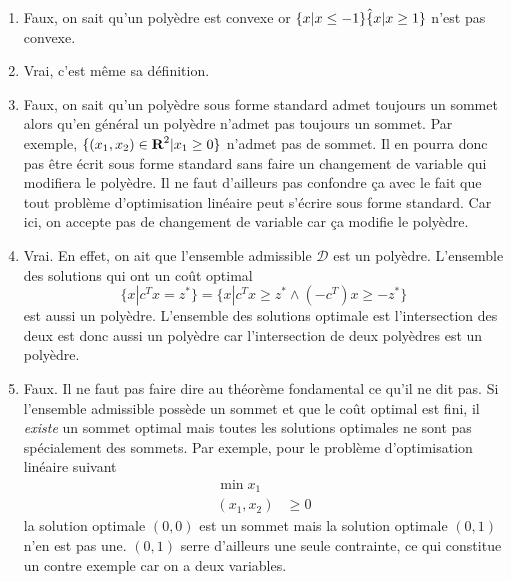 \begin{enumerate}
    \begin{solution}
      \begin{enumerate}
        \item Faux, on sait qu'un polyèdre est convexe or
          $\{x | x \leq -1\} \hat \{x | x \geq 1\}$ n'est pas convexe.
        \item Vrai, c'est même sa définition.
        \item Faux, on sait qu'un polyèdre sous forme standard admet
          toujours un sommet alors qu'en général un polyèdre n'admet pas
          toujours un sommet.
          Par exemple, $\{(x_1,x_2) \in {\mbox{\bf R}}^2 | x_1 \geq 0\}$ n'admet
          pas de sommet. Il en pourra donc pas être écrit sous forme standard
          sans faire un changement de variable qui modifiera le polyèdre.
          Il ne faut d'ailleurs pas confondre ça avec le fait que tout
          problème d'optimisation linéaire peut s'écrire sous forme standard.
          Car ici, on accepte pas de changement de variable car ça
          modifie le polyèdre.
        \item Vrai. En effet, on ait que l'ensemble admissible $\mathcal{D}$
          est un polyèdre.
          L'ensemble des solutions qui ont un coût optimal
          \[ \{x | c^T x = z^*\} =
          \{x | c^T x \geq z^* \land (-c^T) x \geq -z^*\} \]
          est aussi un polyèdre.
          L'ensemble des solutions optimale est l'intersection des deux est
          donc aussi un polyèdre car l'intersection de deux polyèdres est
          un polyèdre.
        \item Faux.
          Il ne faut pas faire dire au théorème fondamental
          ce qu'il ne dit pas.
          Si l'ensemble admissible possède un sommet et que le coût
          optimal est fini,
          il \emph{existe} un sommet optimal mais
          toutes les solutions optimales ne sont
          pas spécialement des sommets.
          Par exemple, pour le problème d'optimisation linéaire suivant
          \begin{align*}
            \min x_1\\
            (x_1,x_2) & \geq 0
          \end{align*}
          la solution optimale $(0,0)$ est un sommet mais la solution
          optimale $(0,1)$
          n'en est pas une.
          $(0,1)$ serre d'ailleurs une seule contrainte,
          ce qui constitue un contre exemple car on a deux variables.
      \end{enumerate}
    \end{solution}

\end{enumerate}
